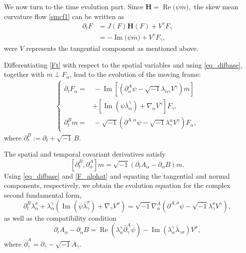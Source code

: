 \documentclass[11pt,letterpaper,reqno]{amsart}
\numberwithin{equation}{section}
\theoremstyle{definition}
\theoremstyle{remark}
\newcommand{\pa}{\partial}
\begin{document}
We now turn to the time evolution part. Since
\(
\mathbf H
=
\operatorname{Re}
\bigl(
\psi\overline m
\bigr),
\)
the skew mean curvature flow \eqref{smcf1} can be written as
\begin{align}
\partial_tF
&=
J(F)\mathbf H(F)+V^\gamma F_\gamma
\nonumber\\
&=
-\operatorname{Im}
\bigl(
\psi\overline m
\bigr)
+
V^\gamma F_\gamma,
\label{Ft}
\end{align}
were \(V\) represents the tangential component as mentioned  above.

Differentiating \eqref{Ft} with respect to the spatial variables and using
\eqref{eq_difbase}, together with \(m\perp F_\alpha\), lead to the evolution
of the moving frame:
\begin{align}
\left\{
\begin{aligned}
\partial_tF_\alpha
=&\,
-\operatorname{Im}
\left[
\left(
\partial_\alpha^A\psi
-
\sqrt{-1}\lambda_{\alpha\gamma}V^\gamma
\right)
\overline m
\right]
\\
&+
\left[
\operatorname{Im}
\left(
\psi\overline{\lambda}_\alpha^{\gamma}
\right)
+
\nabla_\alpha V^\gamma
\right]F_\gamma,
\\
\partial_t^B m
=&\,
-\sqrt{-1}
\left(
\partial^{A,\alpha}\psi
-
\sqrt{-1}\lambda_\gamma^{\alpha}V^\gamma
\right)F_\alpha,
\end{aligned}
\right.
\label{F_alphat}
\end{align}
where
\(
\partial_t^B
:=
\partial_t+\sqrt{-1}\,B.
\)

The spatial and temporal covariant derivatives satisfy
\[
\left[
\partial_t^B,\partial_\alpha^A
\right]m
=
\sqrt{-1}
\left(
\partial_tA_\alpha-\partial_\alpha B
\right)m.
\]
Using \eqref{eq_difbase} and \eqref{F_alphat} and equating the tangential
and normal components, respectively, we obtain the evolution equation for
the complex second fundamental form,
\begin{equation}\label{dt_lambda}
    \pa_t^B \lambda^\sigma_\alpha + \lambda^\gamma_\alpha\left(\operatorname{Im}(\psi \bar{\lambda}^\sigma_\gamma)+\nabla_\gamma V^\sigma\right) = \sqrt{-1}\nabla_\alpha^A\left(\pa^{A,\sigma}\psi -\sqrt{-1}\lambda_\gamma^\sigma V^\gamma\right),
\end{equation}
as well as the compatibility condition
\begin{equation} \label{dt_A}
    \partial_t A_\alpha-\partial_\alpha B=\operatorname{Re}\left(\lambda_\alpha^\gamma \bar{\partial}_\gamma^A \overline{\psi}\right)-\operatorname{Im}\left(\lambda_\alpha^\gamma \bar{\lambda}_{\gamma \sigma}\right) V^\sigma,
\end{equation}
where  $\overline{\partial}_\gamma^A=\partial_\gamma-\sqrt{-1} A_\gamma$.
\end{document}
